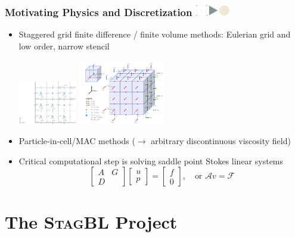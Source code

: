 \documentclass{beamer}
\newcommand\frametitlelogo[1]{\frametitle{#1\hspace{0pt plus 1 filll} \includegraphics[width=42pt]{logo_slides}}}
\newcommand{\StagBL}{\textsc{StagBL}}
\begin{document}
\begin{frame}[fragile]
\frametitlelogo{Motivating Physics and Discretization}
\small
\begin{itemize}
\item Staggered grid finite difference / finite volume methods:
Eulerian grid and
low order, narrow stencil\\
\begin{center}
  \includegraphics[width=0.2\textwidth]{images/StagGrid.pdf} \hspace{10pt}
\includegraphics[width=0.3\textwidth]{images/KausEquations.pdf}
\end{center}
\item Particle-in-cell/MAC methods
 ($\rightarrow$ arbitrary discontinuous viscosity field)
\item Critical computational step is solving saddle point Stokes linear systems
$$
\begin{bmatrix}
A 	&  G \\
D 	&
\end{bmatrix}
\begin{bmatrix}
u \\
p
\end{bmatrix}
=
\begin{bmatrix}
f \\
0
\end{bmatrix},
\quad \text{or } \mathcal{A} v = {\mathcal F}
$$
\end{itemize}
\end{frame}

\section{The \StagBL{} Project}
\end{document}
